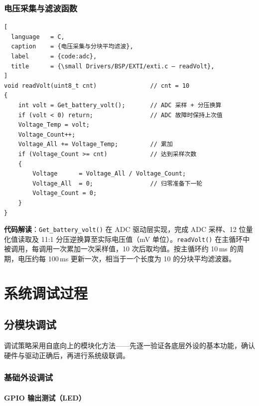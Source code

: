 \documentclass[12pt,a4paper,UTF8]{ctexrep}
\begin{document}
\subsection{电压采集与滤波函数}

\begin{lstlisting}[
  language   = C,
  caption    = {电压采集与分块平均滤波},
  label      = {code:adc},
  title      = {\small Drivers/BSP/EXTI/exti.c — readVolt},
]
void readVolt(uint8_t cnt)               // cnt = 10
{
    int volt = Get_battery_volt();       // ADC 采样 + 分压换算
    if (volt < 0) return;                // ADC 故障时保持上次值
    Voltage_Temp = volt;
    Voltage_Count++;
    Voltage_All += Voltage_Temp;         // 累加
    if (Voltage_Count >= cnt)            // 达到采样次数
    {
        Voltage      = Voltage_All / Voltage_Count;
        Voltage_All  = 0;                // 归零准备下一轮
        Voltage_Count = 0;
    }
}
\end{lstlisting}

\textbf{代码解读}：\texttt{Get\_battery\_volt()} 在 ADC 驱动层实现，完成 ADC 采样、12 位量化值读取及 11:1 分压逆换算至实际电压值（mV 单位）。\texttt{readVolt()} 在主循环中被调用，每调用一次累加一次采样值，10 次后取均值。按主循环约 10\,ms 的周期，电压约每 100\,ms 更新一次，相当于一个长度为 10 的分块平均滤波器。

\chapter{系统调试过程}

\section{分模块调试}

调试策略采用自底向上的模块化方法——先逐一验证各底层外设的基本功能，确认硬件与驱动正确后，再进行系统级联调。

\subsection{基础外设调试}

\subsubsection{GPIO 输出测试（LED）}
\end{document}
